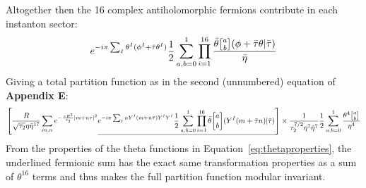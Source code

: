 \documentclass[11pt, class=article, crop=false]{standalone}
\begin{document}
\begin{enumerate}
		Altogether then the 16 complex antiholomorphic fermions contribute in each instanton sector: 
		\[
			e^{-i \pi \sum_I \theta^I (\phi^I + \bar \tau \theta^I)} \frac12 \sum_{a,b=0}^1 \prod_{i=1}^{16} \frac{\bar \theta \twist ab (\phi + \bar \tau \theta  | \bar \tau)}{\bar \eta}
		\]
		Giving a total partition function as in the second (unnumbered) equation of \textbf{Appendix E}:
		\[
			\left[\frac{R}{\sqrt{\tau_2} \eta \bar \eta^{17}} \sum_{m,n} e^{-\frac{\pi R^2}{\tau_2} |m + n \tau|^2} \underline{e^{-i \pi \sum_I n Y^I (m + n \bar \tau) Y^I Y^I}\frac12 \sum_{a,b=0}^1  \prod_{i=1}^{16} \bar \theta \twist ab (Y^I (m + \bar \tau n) | \bar \tau)} \right] \times \frac{1}{\tau_2^{7/2} \eta^7 \bar \eta^7} \frac12 \sum_{a,b = 0}^1 \frac{\theta^4 \twist a b}{\eta^4}
		\]
		From the properties of the theta functions in Equation~\eqref{eq:thetaproperties}, the underlined fermionic sum has the exact same transformation properties as a sum of $\theta^{16}$ terms and thus makes the full partition function modular invariant.
		

\end{enumerate}
\end{document}
